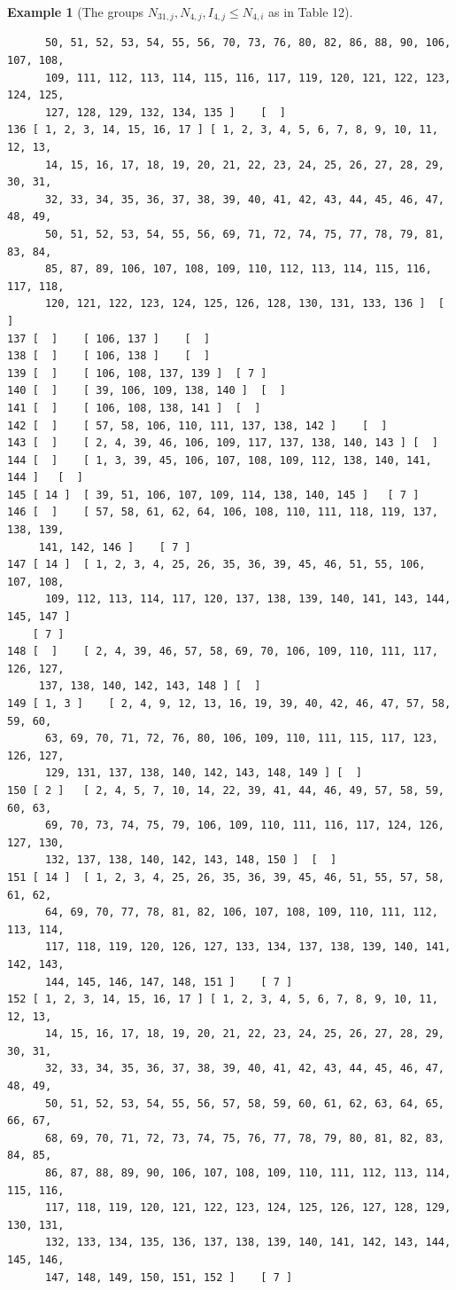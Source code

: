 \documentclass{amsart}
\theoremstyle{plain}
\theoremstyle{definition}
\newtheorem{example}[theorem]{Example}
\theoremstyle{remark}
\begin{document}
\begin{example}[The groups $N_{31,j}, N_{4,j}, I_{4,j}\leq N_{4,i}$ as in Table 12]
\begin{verbatim}
      50, 51, 52, 53, 54, 55, 56, 70, 73, 76, 80, 82, 86, 88, 90, 106, 107, 108, 
      109, 111, 112, 113, 114, 115, 116, 117, 119, 120, 121, 122, 123, 124, 125, 
      127, 128, 129, 132, 134, 135 ]	[  ]
136	[ 1, 2, 3, 14, 15, 16, 17 ]	[ 1, 2, 3, 4, 5, 6, 7, 8, 9, 10, 11, 12, 13, 
      14, 15, 16, 17, 18, 19, 20, 21, 22, 23, 24, 25, 26, 27, 28, 29, 30, 31, 
      32, 33, 34, 35, 36, 37, 38, 39, 40, 41, 42, 43, 44, 45, 46, 47, 48, 49, 
      50, 51, 52, 53, 54, 55, 56, 69, 71, 72, 74, 75, 77, 78, 79, 81, 83, 84, 
      85, 87, 89, 106, 107, 108, 109, 110, 112, 113, 114, 115, 116, 117, 118, 
      120, 121, 122, 123, 124, 125, 126, 128, 130, 131, 133, 136 ]	[  ]
137	[  ]	[ 106, 137 ]	[  ]
138	[  ]	[ 106, 138 ]	[  ]
139	[  ]	[ 106, 108, 137, 139 ]	[ 7 ]
140	[  ]	[ 39, 106, 109, 138, 140 ]	[  ]
141	[  ]	[ 106, 108, 138, 141 ]	[  ]
142	[  ]	[ 57, 58, 106, 110, 111, 137, 138, 142 ]	[  ]
143	[  ]	[ 2, 4, 39, 46, 106, 109, 117, 137, 138, 140, 143 ]	[  ]
144	[  ]	[ 1, 3, 39, 45, 106, 107, 108, 109, 112, 138, 140, 141, 144 ]	[  ]
145	[ 14 ]	[ 39, 51, 106, 107, 109, 114, 138, 140, 145 ]	[ 7 ]
146	[  ]	[ 57, 58, 61, 62, 64, 106, 108, 110, 111, 118, 119, 137, 138, 139, 
     141, 142, 146 ]	[ 7 ]
147	[ 14 ]	[ 1, 2, 3, 4, 25, 26, 35, 36, 39, 45, 46, 51, 55, 106, 107, 108, 
      109, 112, 113, 114, 117, 120, 137, 138, 139, 140, 141, 143, 144, 145, 147 ]
    [ 7 ]
148	[  ]	[ 2, 4, 39, 46, 57, 58, 69, 70, 106, 109, 110, 111, 117, 126, 127, 
     137, 138, 140, 142, 143, 148 ]	[  ]
149	[ 1, 3 ]	[ 2, 4, 9, 12, 13, 16, 19, 39, 40, 42, 46, 47, 57, 58, 59, 60, 
      63, 69, 70, 71, 72, 76, 80, 106, 109, 110, 111, 115, 117, 123, 126, 127, 
      129, 131, 137, 138, 140, 142, 143, 148, 149 ]	[  ]
150	[ 2 ]	[ 2, 4, 5, 7, 10, 14, 22, 39, 41, 44, 46, 49, 57, 58, 59, 60, 63, 
      69, 70, 73, 74, 75, 79, 106, 109, 110, 111, 116, 117, 124, 126, 127, 130, 
      132, 137, 138, 140, 142, 143, 148, 150 ]	[  ]
151	[ 14 ]	[ 1, 2, 3, 4, 25, 26, 35, 36, 39, 45, 46, 51, 55, 57, 58, 61, 62, 
      64, 69, 70, 77, 78, 81, 82, 106, 107, 108, 109, 110, 111, 112, 113, 114, 
      117, 118, 119, 120, 126, 127, 133, 134, 137, 138, 139, 140, 141, 142, 143, 
      144, 145, 146, 147, 148, 151 ]	[ 7 ]
152	[ 1, 2, 3, 14, 15, 16, 17 ]	[ 1, 2, 3, 4, 5, 6, 7, 8, 9, 10, 11, 12, 13, 
      14, 15, 16, 17, 18, 19, 20, 21, 22, 23, 24, 25, 26, 27, 28, 29, 30, 31, 
      32, 33, 34, 35, 36, 37, 38, 39, 40, 41, 42, 43, 44, 45, 46, 47, 48, 49, 
      50, 51, 52, 53, 54, 55, 56, 57, 58, 59, 60, 61, 62, 63, 64, 65, 66, 67, 
      68, 69, 70, 71, 72, 73, 74, 75, 76, 77, 78, 79, 80, 81, 82, 83, 84, 85, 
      86, 87, 88, 89, 90, 106, 107, 108, 109, 110, 111, 112, 113, 114, 115, 116, 
      117, 118, 119, 120, 121, 122, 123, 124, 125, 126, 127, 128, 129, 130, 131, 
      132, 133, 134, 135, 136, 137, 138, 139, 140, 141, 142, 143, 144, 145, 146, 
      147, 148, 149, 150, 151, 152 ]	[ 7 ]
\end{verbatim}
\end{example}
\end{document}
